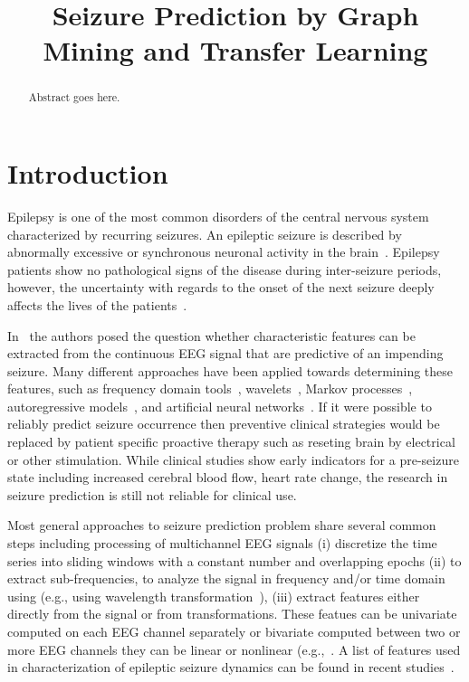 \documentclass{article} %
\title{Seizure Prediction by Graph Mining and Transfer Learning}
\author{
}
\begin{document}
\maketitle

\begin{abstract}
Abstract goes here.  
\end{abstract}

\section{Introduction}
Epilepsy is one of the most common disorders of the central nervous system characterized by recurring seizures.  An epileptic seizure is described by abnormally excessive or synchronous neuronal activity in the brain~\cite{seizure_def}.  Epilepsy patients show no pathological signs of the disease during inter-seizure periods, however, the uncertainty with regards to the onset of the next seizure deeply affects the lives of the patients~\cite{fisher_impact_epilepsy}.  

In~\cite{mormann_seizure_prediction} the authors posed the question whether characteristic features can be extracted from the continuous EEG signal that are predictive of an impending seizure.  Many different approaches have been applied towards determining these features, such as frequency domain tools~\cite{bronzino_eeg,muthuswamy_spectral}, wavelets~\cite{hazarika_wavelet,murali_wavelet}, Markov processes~\cite{lytton_model_epilepsy}, autoregressive models~\cite{anderson_offline_ar,subasi_EEG_AR,chisci_real_time}, and artificial neural networks~\cite{liu_artificial_neural}.  If it were possible to reliably predict seizure occurrence then preventive clinical strategies would be replaced by patient specific proactive therapy such as reseting brain by electrical or other stimulation.  While clinical studies show early indicators for a pre-seizure state including increased cerebral blood flow, heart rate change, the research in seizure prediction is still not reliable for clinical use.

Most general approaches to seizure prediction problem share several common steps including processing of multichannel EEG signals (i) discretize the time series into sliding windows with a constant number and overlapping epochs (ii) to extract sub-frequencies, to analyze the signal in frequency and/or time domain using (e.g., using wavelength transformation~\cite{acar_seizure_localization}), (iii) extract features either directly from the signal or from transformations.  These featues can be univariate computed on each EEG channel separately or bivariate computed  between two or more EEG channels they can be linear or nonlinear (e.g.,~\cite{mormann2005predictability}.  A list of features used in characterization of epileptic seizure dynamics can be found in recent studies~\cite{paivinen2005epileptic,mormann2005predictability,van2005detecting}.
\end{document}
